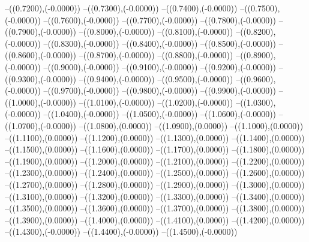 {	--({\sx*(0.7200)},{\sy*(-0.0000)})
	--({\sx*(0.7300)},{\sy*(-0.0000)})
	--({\sx*(0.7400)},{\sy*(-0.0000)})
	--({\sx*(0.7500)},{\sy*(-0.0000)})
	--({\sx*(0.7600)},{\sy*(-0.0000)})
	--({\sx*(0.7700)},{\sy*(-0.0000)})
	--({\sx*(0.7800)},{\sy*(-0.0000)})
	--({\sx*(0.7900)},{\sy*(-0.0000)})
	--({\sx*(0.8000)},{\sy*(-0.0000)})
	--({\sx*(0.8100)},{\sy*(-0.0000)})
	--({\sx*(0.8200)},{\sy*(-0.0000)})
	--({\sx*(0.8300)},{\sy*(-0.0000)})
	--({\sx*(0.8400)},{\sy*(-0.0000)})
	--({\sx*(0.8500)},{\sy*(-0.0000)})
	--({\sx*(0.8600)},{\sy*(-0.0000)})
	--({\sx*(0.8700)},{\sy*(-0.0000)})
	--({\sx*(0.8800)},{\sy*(-0.0000)})
	--({\sx*(0.8900)},{\sy*(-0.0000)})
	--({\sx*(0.9000)},{\sy*(-0.0000)})
	--({\sx*(0.9100)},{\sy*(-0.0000)})
	--({\sx*(0.9200)},{\sy*(-0.0000)})
	--({\sx*(0.9300)},{\sy*(-0.0000)})
	--({\sx*(0.9400)},{\sy*(-0.0000)})
	--({\sx*(0.9500)},{\sy*(-0.0000)})
	--({\sx*(0.9600)},{\sy*(-0.0000)})
	--({\sx*(0.9700)},{\sy*(-0.0000)})
	--({\sx*(0.9800)},{\sy*(-0.0000)})
	--({\sx*(0.9900)},{\sy*(-0.0000)})
	--({\sx*(1.0000)},{\sy*(-0.0000)})
	--({\sx*(1.0100)},{\sy*(-0.0000)})
	--({\sx*(1.0200)},{\sy*(-0.0000)})
	--({\sx*(1.0300)},{\sy*(-0.0000)})
	--({\sx*(1.0400)},{\sy*(-0.0000)})
	--({\sx*(1.0500)},{\sy*(-0.0000)})
	--({\sx*(1.0600)},{\sy*(-0.0000)})
	--({\sx*(1.0700)},{\sy*(-0.0000)})
	--({\sx*(1.0800)},{\sy*(0.0000)})
	--({\sx*(1.0900)},{\sy*(0.0000)})
	--({\sx*(1.1000)},{\sy*(0.0000)})
	--({\sx*(1.1100)},{\sy*(0.0000)})
	--({\sx*(1.1200)},{\sy*(0.0000)})
	--({\sx*(1.1300)},{\sy*(0.0000)})
	--({\sx*(1.1400)},{\sy*(0.0000)})
	--({\sx*(1.1500)},{\sy*(0.0000)})
	--({\sx*(1.1600)},{\sy*(0.0000)})
	--({\sx*(1.1700)},{\sy*(0.0000)})
	--({\sx*(1.1800)},{\sy*(0.0000)})
	--({\sx*(1.1900)},{\sy*(0.0000)})
	--({\sx*(1.2000)},{\sy*(0.0000)})
	--({\sx*(1.2100)},{\sy*(0.0000)})
	--({\sx*(1.2200)},{\sy*(0.0000)})
	--({\sx*(1.2300)},{\sy*(0.0000)})
	--({\sx*(1.2400)},{\sy*(0.0000)})
	--({\sx*(1.2500)},{\sy*(0.0000)})
	--({\sx*(1.2600)},{\sy*(0.0000)})
	--({\sx*(1.2700)},{\sy*(0.0000)})
	--({\sx*(1.2800)},{\sy*(0.0000)})
	--({\sx*(1.2900)},{\sy*(0.0000)})
	--({\sx*(1.3000)},{\sy*(0.0000)})
	--({\sx*(1.3100)},{\sy*(0.0000)})
	--({\sx*(1.3200)},{\sy*(0.0000)})
	--({\sx*(1.3300)},{\sy*(0.0000)})
	--({\sx*(1.3400)},{\sy*(0.0000)})
	--({\sx*(1.3500)},{\sy*(0.0000)})
	--({\sx*(1.3600)},{\sy*(0.0000)})
	--({\sx*(1.3700)},{\sy*(0.0000)})
	--({\sx*(1.3800)},{\sy*(0.0000)})
	--({\sx*(1.3900)},{\sy*(0.0000)})
	--({\sx*(1.4000)},{\sy*(0.0000)})
	--({\sx*(1.4100)},{\sy*(0.0000)})
	--({\sx*(1.4200)},{\sy*(0.0000)})
	--({\sx*(1.4300)},{\sy*(-0.0000)})
	--({\sx*(1.4400)},{\sy*(-0.0000)})
	--({\sx*(1.4500)},{\sy*(-0.0000)})
}
